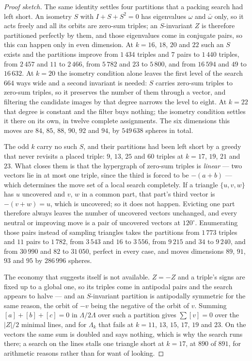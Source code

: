 \documentclass[11pt]{amsart}
\theoremstyle{remark}
\begin{document}
\begin{proof}[Proof sketch]
The same identity settles four partitions that a packing search had left short. An isometry
$S$ with $I+S+S^2=0$ has eigenvalues $\omega$ and $\bar\omega$ only, so it acts freely and
all its orbits are zero-sum triples; an $S$-invariant $Z$ is therefore partitioned perfectly
by them, and those eigenvalues come in conjugate pairs, so this can happen only in even
dimension. At $k=16$, $18$, $20$ and $22$ such an $S$ exists and the partitions improve
from $1\,434$ triples and $7$ pairs to $1\,440$ triples, from $2\,457$ and $11$ to $2\,466$,
from $5\,782$ and $23$ to $5\,800$, and from $16\,594$ and $49$ to $16\,632$. At
$k=20$ the isometry condition alone leaves the first level of the search $664$ ways
wide and a second invariant is needed: $S$ carries zero-sum triples to zero-sum triples,
so it preserves the number of them through a vector, and filtering the candidate images by
that degree narrows the level to eight. At $k=22$ that degree is constant and the filter
buys nothing; the isometry condition settles it there on its own, in twelve complete
assignments. The six dimensions this moves are $84$, $85$, $88$, $90$, $92$ and $94$, by
$549\,638$ spheres in total.

The odd $k$ carry no such $S$, and their partitions had been left short by a greedy that
never revisits a placed triple: $9$, $13$, $25$ and $60$ triples at $k=17$, $19$, $21$ and
$23$. What closes them is that the hypergraph of zero-sum triples is \emph{linear} --- two
vectors lie in at most one triple, since the third is forced to be $-(a+b)$ --- which
determines the move set of a local search completely. If a triangle $\{u,v,w\}$ has $u$
uncovered and $v$, $w$ in a common part, that part's third vector is $-(v+w)=u$, which is
uncovered; so it does not happen. Evicting one part therefore always leaves the number of
uncovered vectors unchanged, and every neutral or improving move is a pair of uncovered
vectors at $120^\circ$. Enumerating those pairs instead of sampling triangles takes the
partitions from $1\,773$ triples and $11$ pairs to $1\,782$, from $3\,543$ and $16$ to
$3\,556$, from $9\,215$ and $34$ to $9\,240$, and from $30\,990$ and $82$ to $31\,050$,
perfect in every case, and moves dimensions $89$, $91$, $93$ and $95$ by $286\,996$
spheres.

The economy that suggests itself is not available. $Z=-Z$ and a triple's signs are fixed up to
a global one, so its triples come in antipodal pairs and the search appears to halve --- and
an $S$-invariant partition is antipodally symmetric for the same reason, the orbit of $-v$
being the negative of the orbit of $v$. Summing $[a]+[b]+[c]=0$ in $\Lambda/2\Lambda$ over
such a partition gives $\sum[v]=0$ over the $|Z|/2$ minimal lines, and for $\Lambda_k$ that
fails at $k=11$, $13$, $15$, $17$, $19$ and $23$. On the vectors the same sum is doubled and
says nothing, which is why the search runs there; a search on the lines stalls one triangle
short at $k=17$, at $890$ of $891$, for arithmetic reasons rather than for want of looking.


\end{proof}
\end{document}
